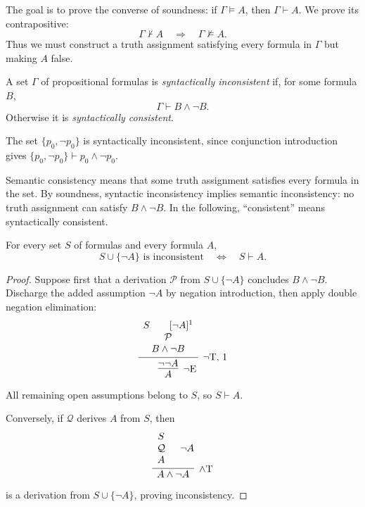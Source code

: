 \documentclass[11pt,a4paper]{amsart}
\begin{document}
The goal is to prove the converse of soundness: if \(\Gamma\models A\),
then \(\Gamma\vdash A\). We prove its contrapositive:
\[
  \Gamma\nvdash A \quad\Longrightarrow\quad \Gamma\not\models A.
\]
Thus we must construct a truth assignment satisfying every formula in
\(\Gamma\) but making \(A\) false.

\begin{definition}
  A set \(\Gamma\) of propositional formulas is \emph{syntactically
  inconsistent} if, for some formula \(B\),
  \[
    \Gamma\vdash B\land\neg B.
  \]
  Otherwise it is \emph{syntactically consistent}.
\end{definition}

\begin{example}
  The set \(\{p_0,\neg p_0\}\) is syntactically inconsistent, since
  conjunction introduction gives
  \(\{p_0,\neg p_0\}\vdash p_0\land\neg p_0\).
\end{example}

Semantic consistency means that some truth assignment satisfies every
formula in the set. By soundness, syntactic inconsistency implies
semantic inconsistency: no truth assignment can satisfy \(B\land\neg B\).
In the following, ``consistent'' means syntactically consistent.

\begin{lemma}\label{lem:consistency-negated-assumption}
  For every set \(S\) of formulas and every formula \(A\),
  \[
    S\cup\{\neg A\}\text{ is inconsistent}
    \quad\Longleftrightarrow\quad S\vdash A.
  \]
\end{lemma}

\begin{proof}
  Suppose first that a derivation \(\mathcal P\) from
  \(S\cup\{\neg A\}\) concludes \(B\land\neg B\). Discharge the
  added assumption \(\neg A\) by negation introduction, then apply
  double negation elimination:
  \[
    \infer[\neg\mathrm E]{A}{
      \infer[\neg\mathrm T,\,1]{\neg\neg A}{
        \begin{array}{c}
          S\qquad[\neg A]^1\\
          \mathcal P\\
          B\land\neg B
        \end{array}
      }
    }
  \]
  All remaining open assumptions belong to \(S\), so \(S\vdash A\).

  Conversely, if \(\mathcal Q\) derives \(A\) from \(S\), then
  \[
    \infer[\land\mathrm T]{A\land\neg A}{
      \begin{array}{c}S\\\mathcal Q\\A
      \end{array}
      & \neg A
    }
  \]
  is a derivation from \(S\cup\{\neg A\}\), proving inconsistency.
\end{proof}
\end{document}
